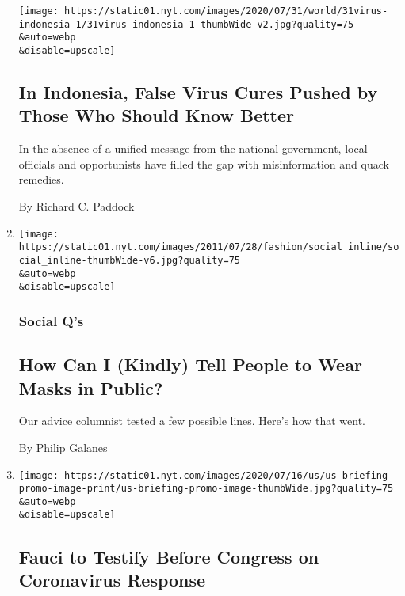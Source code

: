 \begin{enumerate}
  \texttt{[image: https://static01.nyt.com/images/2020/07/31/world/31virus-indonesia-1/31virus-indonesia-1-thumbWide-v2.jpg?quality=75\\\&auto=webp\\\&disable=upscale]}

  \hypertarget{in-indonesia-false-virus-cures-pushed-by-those-who-should-know-better}{%
  \subsection{In Indonesia, False Virus Cures Pushed by Those Who Should
  Know
  Better}\label{in-indonesia-false-virus-cures-pushed-by-those-who-should-know-better}}

  In the absence of a unified message from the national government,
  local officials and opportunists have filled the gap with
  misinformation and quack remedies.

  By Richard C. Paddock
\item
  \href{/2020/07/30/style/masks-in-public-coronavirus.html}{}

  \texttt{[image: https://static01.nyt.com/images/2011/07/28/fashion/social\_inline/social\_inline-thumbWide-v6.jpg?quality=75\\\&auto=webp\\\&disable=upscale]}

  \hypertarget{social-qs}{%
  \subsubsection{Social Q's}\label{social-qs}}

  \hypertarget{how-can-i-kindly-tell-people-to-wear-masks-in-public}{%
  \subsection{How Can I (Kindly) Tell People to Wear Masks in
  Public?}\label{how-can-i-kindly-tell-people-to-wear-masks-in-public}}

  Our advice columnist tested a few possible lines. Here's how that
  went.

  By Philip Galanes
\item
  \href{/2020/07/30/world/coronavirus-covid-19.html}{}

  \texttt{[image: https://static01.nyt.com/images/2020/07/16/us/us-briefing-promo-image-print/us-briefing-promo-image-thumbWide.jpg?quality=75\\\&auto=webp\\\&disable=upscale]}

  \hypertarget{fauci-to-testify-before-congress-on-coronavirus-response}{%
  \subsection{Fauci to Testify Before Congress on Coronavirus
  Response}\label{fauci-to-testify-before-congress-on-coronavirus-response}}


\end{enumerate}
